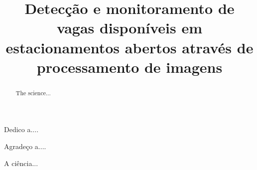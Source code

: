 \documentclass[bacharelado]{unb-cic}
\title{Detecção e monitoramento de vagas disponíveis em estacionamentos abertos através de processamento de imagens}
\begin{document}
  \maketitle
  \pretextual

  \begin{dedicatoria}
  Dedico a....
  \end{dedicatoria}

  \begin{agradecimentos}
  Agradeço a....
  \end{agradecimentos}

  \begin{resumo}
  A ciência...
  \end{resumo}

  \begin{abstract}
  The science...
  \end{abstract}

  \tableofcontents
  \listoffigures
  \listoftables

  \textual
  
	
	
	
	
	
  

  \postextual
  
  
\end{document}
